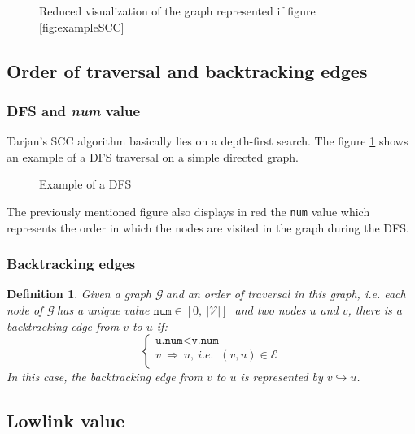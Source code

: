 \documentclass[a4 paper, 12pt]{article}
\def\GG{$\mathcal{G}~$}
\newtheorem{definition}{Definition}
\begin{document}
\begin{figure}[!h]
    \caption{Reduced visualization of the graph represented if figure \ref{fig:exampleSCC}}
\end{figure}

\subsection{Order of traversal and backtracking edges}
\subsubsection{DFS and \textit{num} value}
Tarjan's SCC algorithm basically lies on a depth-first search. The figure \ref{fig:dfs} shows an example of a DFS traversal on a simple directed graph.
\begin{figure}[!h]
    \caption{Example of a DFS\label{fig:dfs}}
\end{figure}

The previously mentioned figure also displays in red the \texttt{num} value which represents the order in which the nodes are visited in the graph during the DFS.

\subsubsection{Backtracking edges}
\begin{definition}
    Given a graph \GG and an order of traversal in this graph, \textit{i.e.} each node of \GG has a unique value $\texttt{num} \in [0,~|\mathcal{V}|]~$ and two nodes $u$ and $v$, there is a backtracking edge from $v$ to $u$ if:
    \begin{equation*}
        \left\{
            \begin{array}{l}
                \texttt{u.num} < \texttt{v.num}\\
                v~\Rightarrow~u,~\textit{i.e. }~(v, u) \in \mathcal{E}\\
            \end{array}
        \right.
    \end{equation*}
    In this case, the backtracking edge from $v$ to $u$ is represented by $v \hookrightarrow u$.\\      
\end{definition}


\subsection{Lowlink value}
\end{document}
